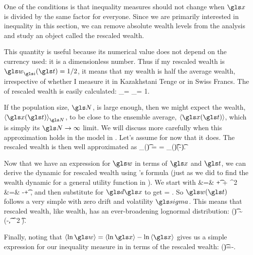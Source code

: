 One of the conditions is that inequality measures should not change when $\x$ is divided by the same factor for everyone. Since we are primarily interested in inequality in this section, we can remove absolute wealth levels from the analysis and study an object called the rescaled wealth.


This quantity is useful because its numerical value does not 
depend on the currency used: it is a dimensionless number. 
Thus if my rescaled wealth is $\gw_\gi(\t) = 1/2$, it means that my wealth is half the 
average wealth, irrespective of whether I measure it in Kazakhstani Tenge 
or in Swiss Francs. The \FEA of rescaled wealth is easily calculated:
\be
\ave{\gw_\gi(\t)}_\N = \ave{\frac{\x(\t)}{\ave{\x(\t)}_\N}}_\N = 1.
\ee

If the population size, $\N$, is large enough, then we might expect the \FEA wealth, $\ave{\x(\t)}_\N$, to be close to the ensemble average, $\ave{\x(\t)}$, which is simply its $\N\to\infty$ limit. We will discuss more carefully when this approximation holds in the \GBM model in . Let's assume for now that it does. The rescaled wealth is then well approximated as
\be
\gw_\gi(\t) = \frac{\x_\gi(\t)}{\ave{\x(\t)}} = \x_\gi(\t)\exp(-\gmu \t).
\ee

Now that we have an expression for $\gw$ in terms of $\x$ and $\t$, we can derive the dynamic for rescaled wealth using \Ito's formula (just as we did to find the wealth dynamic for a general utility function in ). We start with
\bea
\gd \gw &=& \frac{\partial \gw}{\partial \t}\gd\t + \frac{\partial \gw}{\partial \x}\gd\x +   \gd\x^2 \\
&=& -\gmu \gw\gd\t + \frac{\gw}{\x}\gd\x {},
\eea
and then substitute  for $\gd\x$ to get
\be
\gd \gw = \gw \gsigma \gd\gW.
\ee
So $\gw(\t)$ follows a very simple \GBM with zero drift and volatility $\gsigma$. This means that rescaled wealth, like wealth, has an ever-broadening lognormal distribution:
\be
\ln \gw(\t) \sim \mathcal{\N}\left(-\t, \gsigma^2 \t\right).
\ee

Finally, noting that $\ave{\ln \gw}=\ave{\ln \x}-\ln\ave{\x}$ gives us a simple expression for our inequality measure in  in terms of the rescaled wealth:
\be
\J(\t)=-\ave{\ln \gw}.
\ee

